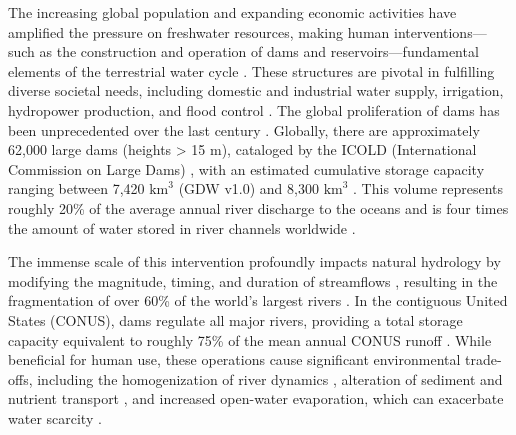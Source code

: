\documentclass[hess, manuscript]{copernicus}
\begin{document}


\introduction 


The increasing global population and expanding economic activities have amplified the pressure on freshwater resources, making human interventions—such as the construction and operation of dams and reservoirs—fundamental elements of the terrestrial water cycle \citep{Biemans2011, Busker2019, Sadki2023, Moreno-Rodenas2025}. These structures are pivotal in fulfilling diverse societal needs, including domestic and industrial water supply, irrigation, hydropower production, and flood control \citep{Mekonnen2012, Abeshu2023, Sadki2023, Lehner2024, Shrestha2024, Moreno-Rodenas2025}. The global proliferation of dams has been unprecedented over the last century \citep{Lehner2024, Moreno-Rodenas2025}. Globally, there are approximately 62,000 large dams (heights > 15 m), cataloged by the ICOLD (International Commission on Large Dams)  \citep{Moreno-Rodenas2025}, with an estimated cumulative storage capacity ranging between 7,420 $\text{km}^3$  (GDW v1.0) \citep{Lehner2024} and 8,300 $\text{km}^3$ \citep{Sadki2023}. This volume represents roughly 20\% of the average annual river discharge to the oceans and is four times the amount of water stored in river channels worldwide \citep{Sadki2023}.

The immense scale of this intervention profoundly impacts natural hydrology by modifying the magnitude, timing, and duration of streamflows \citep{Shin2019, Salwey2024}, resulting in the fragmentation of over 60\% of the world's largest rivers \citep{Sadki2023}. In the contiguous United States (CONUS), dams regulate all major rivers, providing a total storage capacity equivalent to roughly 75\% of the mean annual CONUS runoff \citep{Steyaert2022}. While beneficial for human use, these operations cause significant environmental trade-offs, including the homogenization of river dynamics \citep{Scherer2016, Lehner2024}, alteration of sediment and nutrient transport \citep{Shin2019, Yassin2019}, and increased open-water evaporation, which can exacerbate water scarcity \citep{Scherer2016, Yassin2019, Liu2026}.
\end{document}
